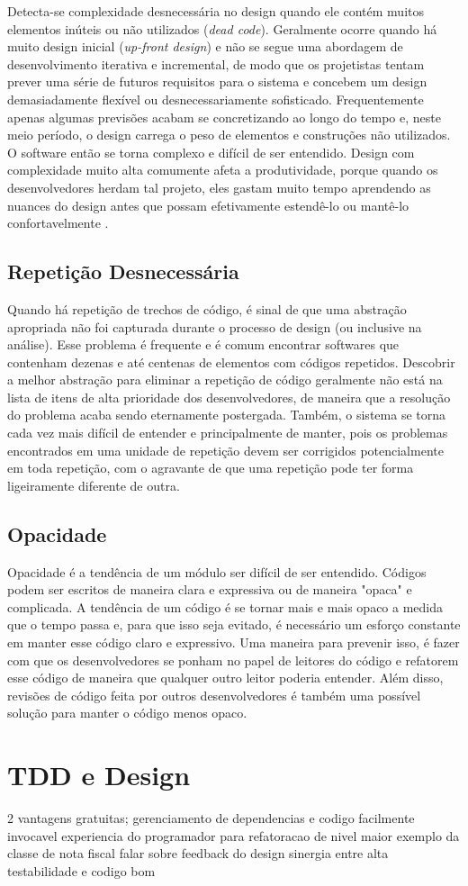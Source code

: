Detecta-se complexidade desnecessária no design quando ele contém muitos elementos inúteis ou não utilizados (\textit{dead code}). Geralmente ocorre quando há muito design inicial (\textit{up-front design}) e não se segue uma abordagem de desenvolvimento iterativa e incremental, de modo que os projetistas tentam prever uma série de futuros requisitos para o sistema e concebem um design demasiadamente flexível ou desnecessariamente sofisticado. Frequentemente apenas algumas previsões acabam se concretizando ao longo do tempo e, neste meio período, o design carrega o peso de elementos e construções não utilizados. O software então se torna complexo e difícil de ser entendido. Design com complexidade muito alta comumente afeta a produtividade, porque quando os desenvolvedores herdam tal projeto, eles gastam muito tempo aprendendo as nuances do design antes que possam efetivamente estendê-lo ou mantê-lo confortavelmente \cite{kerievsky}.

\subsection{Repetição Desnecessária}

Quando há repetição de trechos de código, é sinal de que uma abstração apropriada não foi capturada durante o processo de design (ou inclusive na análise).
Esse problema é frequente e é comum encontrar softwares que contenham dezenas e até centenas de elementos com códigos repetidos. Descobrir a melhor abstração para eliminar a repetição de código geralmente não está na lista de itens de alta prioridade dos desenvolvedores, de maneira que a resolução do problema acaba sendo eternamente postergada. Também, o sistema se torna cada vez mais difícil de entender e principalmente de manter, pois os problemas encontrados em uma unidade de repetição devem ser corrigidos potencialmente em toda repetição, com o agravante de que uma repetição pode ter forma ligeiramente diferente de outra.

\subsection{Opacidade}

Opacidade é a tendência de um módulo ser difícil de ser entendido. Códigos podem ser escritos de maneira clara e expressiva ou de maneira "opaca" e complicada.
A tendência de um código é se tornar mais e mais opaco a medida que o tempo passa e, para que isso seja evitado, é necessário um esforço constante em 
manter esse código claro e expressivo. Uma maneira para prevenir isso, é fazer com que os desenvolvedores se ponham no papel de leitores do código e
refatorem esse código de maneira que qualquer outro leitor poderia entender. Além disso, revisões de código feita por outros desenvolvedores é também
uma possível solução para manter o código menos opaco.


\section{TDD e Design}
2 vantagens gratuitas; gerenciamento de dependencias e codigo facilmente invocavel
experiencia do programador para refatoracao de nivel maior
exemplo da classe de nota fiscal
falar sobre feedback do design
sinergia entre alta testabilidade e codigo bom
